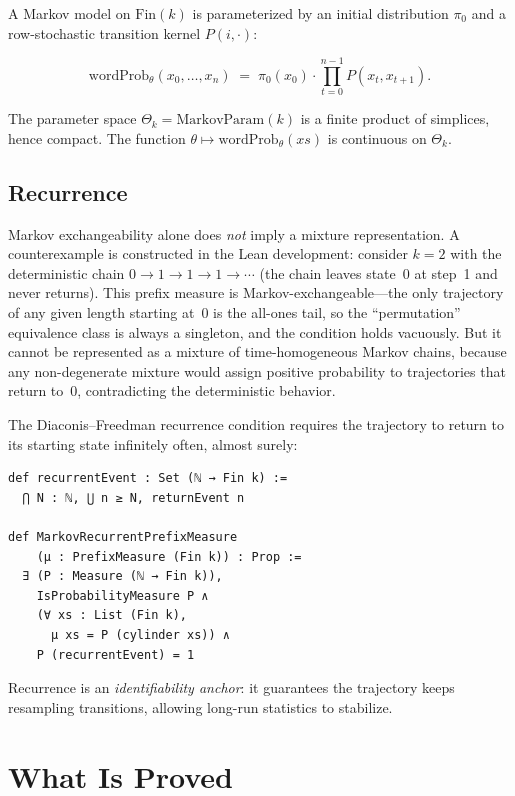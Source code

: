 \documentclass[11pt]{article}
\theoremstyle{definition}
\newcommand{\Fin}{\mathrm{Fin}}
\begin{document}
A Markov model on $\Fin(k)$ is parameterized by an initial distribution
$\pi_0$ and a row-stochastic transition kernel $P(i,\cdot)$:

\[
\mathrm{wordProb}_\theta(x_0, \ldots, x_n)
\;=\; \pi_0(x_0) \cdot \prod_{t=0}^{n-1} P(x_t, x_{t+1}).
\]

The parameter space $\Theta_k = \mathrm{MarkovParam}(k)$ is a finite product
of simplices, hence compact.  The function
$\theta \mapsto \mathrm{wordProb}_\theta(xs)$ is continuous on $\Theta_k$.

\subsection{Recurrence}

Markov exchangeability alone does \emph{not} imply a mixture representation.
A counterexample is constructed in the Lean development: consider $k = 2$
with the deterministic chain $0 \to 1 \to 1 \to 1 \to \cdots$ (the chain
leaves state~0 at step~1 and never returns).  This prefix measure is
Markov-exchangeable---the only trajectory of any given length starting at~0
is the all-ones tail, so the ``permutation'' equivalence class is always
a singleton, and the condition holds vacuously.  But it cannot be
represented as a mixture of time-homogeneous Markov chains, because any
non-degenerate mixture would assign positive probability to trajectories
that return to~0, contradicting the deterministic behavior.

The Diaconis--Freedman recurrence condition requires the trajectory to
return to its starting state infinitely often, almost surely:

\begin{lstlisting}
def recurrentEvent : Set (ℕ → Fin k) :=
  ⋂ N : ℕ, ⋃ n ≥ N, returnEvent n

def MarkovRecurrentPrefixMeasure
    (μ : PrefixMeasure (Fin k)) : Prop :=
  ∃ (P : Measure (ℕ → Fin k)),
    IsProbabilityMeasure P ∧
    (∀ xs : List (Fin k),
      μ xs = P (cylinder xs)) ∧
    P (recurrentEvent) = 1
\end{lstlisting}

Recurrence is an \emph{identifiability anchor}: it guarantees the trajectory
keeps resampling transitions, allowing long-run statistics to stabilize.

\section{What Is Proved}
\label{sec:proved}
\end{document}
